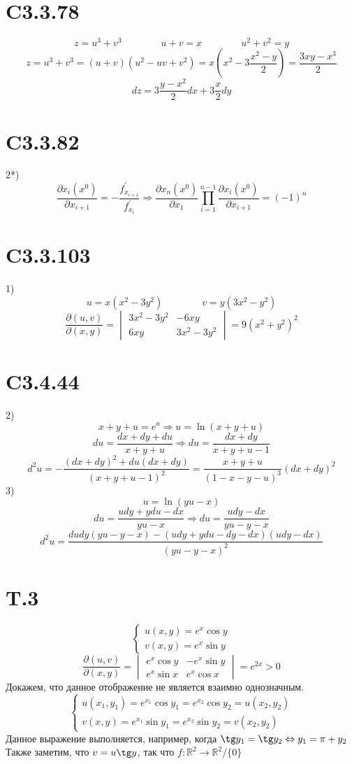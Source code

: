 \documentclass[a4paper,12pt]{article} %
\begin{document}
\section*{C3.3.78}
$$z=u^3+v^3\quad\quad\quad\quad u+v=x\quad\quad\quad\quad u^2+v^2=y$$
$$z=u^3+v^3=(u+v)(u^2-uv+v^2)=x(x^2-3\frac{x^2-y}{2})=\frac{3xy-x^3}{2}$$
$$dz=3\frac{y-x^2}{2}dx+3\frac{x}{2}dy$$
\section*{C3.3.82}
2*) $$\frac{\partial x_i(x^0)}{\partial x_{i+1}}=-\frac{f^{\prime}_{x_{i+1}}}{f^{\prime}_{x_{i}}}\Rightarrow\frac{\partial x_n(x^0)}{\partial x_{1}}\prod_{i=1}^{n-1}\frac{\partial x_i(x^0)}{\partial x_{i+1}}=(-1)^n$$
\section*{C3.3.103}1)
$$u=x(x^2-3y^2)\quad\quad\quad\quad v=y(3x^2-y^2)$$
$$\frac{\partial(u,v)}{\partial(x,y)}=\begin{vmatrix*}3x^2-3y^2&-6xy\\6xy&3x^2-3y^2\end{vmatrix*}=9(x^2+y^2)^2$$
\section*{C3.4.44}2) $$x+y+u=e^{u}\Rightarrow u=\ln(x+y+u)$$
$$du=\frac{dx+dy+du}{x+y+u}\Rightarrow du=\frac{dx+dy}{x+y+u-1}$$
$$d^2u=-\frac{(dx+dy)^2+du(dx+dy)}{(x+y+u-1)^2}=\frac{x+y+u}{(1-x-y-u)^3}(dx+dy)^2$$
3)$$u=\ln(yu-x)$$
$$du=\frac{udy+ydu-dx}{yu-x}\Rightarrow du=\frac{udy-dx}{yu-y-x}$$
$$d^2u=\frac{dudy(yu-y-x)-(udy+ydu-dy-dx)(udy-dx)}{(yu-y-x)^2}$$
\section*{T.3}
$$\begin{cases}
u(x,y)=e^{x}\cos y\\
v(x,y)=e^{x}\sin y
\end{cases}$$
$$\frac{\partial(u,v)}{\partial(x,y)}=\begin{vmatrix*}e^{x}\cos y&-e^{x}\sin y\\e^{x}\sin x&e^{x}\cos x\end{vmatrix*}=e^{2x}>0$$
Докажем, что данное отображение не является взаимно однозначным.
$$\begin{cases}
u(x_1,y_1)=e^{x_1}\cos y_1=e^{x_2}\cos y_2=u(x_2,y_2)\\
v(x,y)=e^{x_1}\sin y_1=e^{x_2}\sin y_2=v(x_2,y_2)
\end{cases}$$
Данное выражение выполняется, например, когда $\tg y_1=\tg y_2\Leftrightarrow y_1=\pi+y_2$\\
Также заметим, что $v=u\tg y$, так что $f:\mathbb{R}^2\to\mathbb{R}^2/\{0\}$
\end{document}
